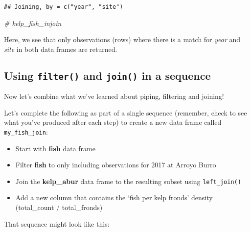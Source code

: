 \documentclass[]{book}
\newenvironment{Shaded}{\begin{snugshade}}{\end{snugshade}}
\newcommand{\CommentTok}[1]{\textcolor[rgb]{0.56,0.35,0.01}{\textit{#1}}}
\newcommand{\KeywordTok}[1]{\textcolor[rgb]{0.13,0.29,0.53}{\textbf{#1}}}
\newcommand{\NormalTok}[1]{#1}
\newcommand{\OperatorTok}[1]{\textcolor[rgb]{0.81,0.36,0.00}{\textbf{#1}}}
\newcommand{\StringTok}[1]{\textcolor[rgb]{0.31,0.60,0.02}{#1}}
\providecommand{\tightlist}{%
  \setlength{\itemsep}{0pt}\setlength{\parskip}{0pt}}
\begin{document}
\begin{Shaded}
\end{Shaded}

\begin{verbatim}
## Joining, by = c("year", "site")
\end{verbatim}

\begin{Shaded}
\begin{Highlighting}[]
\CommentTok{# kelp_fish_injoin}
\end{Highlighting}
\end{Shaded}

Here, we see that only observations (rows) where there is a match for \emph{year} and \emph{site} in both data frames are returned.

\hypertarget{using-filter-and-join-in-a-sequence}{%
\subsection{\texorpdfstring{Using \texttt{filter()} and \texttt{join()} in a sequence}{Using filter() and join() in a sequence}}\label{using-filter-and-join-in-a-sequence}}

Now let's combine what we've learned about piping, filtering and joining!

Let's complete the following as part of a single sequence (remember, check to see what you've produced after each step) to create a new data frame called \texttt{my\_fish\_join}:

\begin{itemize}
\tightlist
\item
  Start with \textbf{fish} data frame
\item
  Filter \textbf{fish} to only including observations for 2017 at Arroyo Burro
\item
  Join the \textbf{kelp\_abur} data frame to the resulting subset using \texttt{left\_join()}
\item
  Add a new column that contains the `fish per kelp fronds' density (total\_count / total\_fronds)
\end{itemize}

That sequence might look like this:
\end{document}
